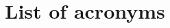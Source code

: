 \documentclass{report}
\theoremstyle{definition}
\theoremstyle{remark}
\begin{document}






\newpage
\chapter*{List of acronyms}


\newpage



\listoffigures
\listoftables

\printindex
\end{document}
